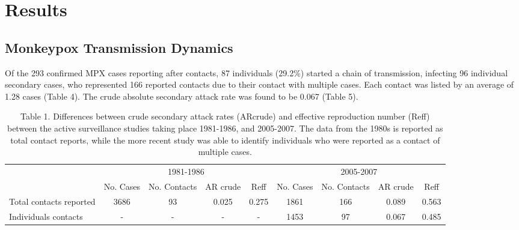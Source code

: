 \section{Results}

\subsection*{Monkeypox Transmission Dynamics}
Of the 293 confirmed MPX cases reporting after contacts, 87 individuals (29.2\%) started a chain of transmission, infecting 96 individual secondary cases, who represented 166 reported contacts due to their contact with multiple cases. Each contact was listed by an average of 1.28 cases (Table 4). The crude absolute secondary attack rate was found to be 0.067 (Table 5).


\begin{table}[!hb]
        \begin{tabular}{@{}lcccccccc@{}} 
        \toprule
         & \multicolumn{4}{c}{1981-1986} & \multicolumn{4}{c}{2005-2007} \\ %
\cmidrule(r){2-5} %
\cmidrule(l){6-9}
 & No. Cases & No. Contacts & AR crude & Reff & No. Cases & No. Contacts & AR crude & Reff\\ 
\midrule %
Total contacts reported & 3686 & 93 & 0.025 & 0.275 & 1861 & 166 & 0.089 & 0.563\\ 
Individuals contacts & - & - & - & - & 1453 & 97 & 0.067 & 0.485\\ 
\bottomrule
        \end{tabular}
           \caption{Table 1. Differences between crude secondary attack rates (ARcrude) and effective reproduction number (Reff) between the active surveillance studies taking place 1981-1986, and 2005-2007. The data from the 1980s is reported as total contact reports, while the more recent study was able to identify individuals who were reported as a contact of multiple cases.}
     \label{tab:table}
      \end{table}
      
